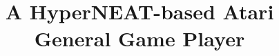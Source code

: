 \documentclass{acm_proc_article-sp}
\begin{document}
\title{A HyperNEAT-based Atari General Game Player}
%
%
%
%
%
\end{document}
